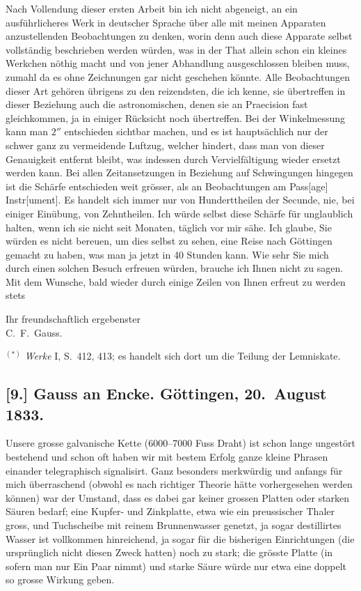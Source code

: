 \documentclass[12pt,a4paper]{article}
\begin{document}
Nach Vollendung dieser ersten Arbeit bin ich nicht abgeneigt, an ein ausf\"uhrlicheres Werk in deutscher Sprache \"uber alle mit meinen Apparaten anzustellenden Beobachtungen zu denken, worin denn auch diese Apparate selbst vollst\"andig beschrieben werden w\"urden, was in der That allein schon ein kleines Werkchen n\"othig macht und von jener Abhandlung ausgeschlossen bleiben muss, zumahl da es ohne Zeichnungen gar nicht geschehen k\"onnte. Alle Beobachtungen dieser Art geh\"oren \"ubrigens zu den reizendsten, die ich kenne, sie \"ubertreffen in dieser Beziehung auch die astronomischen, denen sie an Praecision fast gleichkommen, ja in einiger R\"ucksicht noch \"ubertreffen. Bei der Winkelmessung kann man $2''$ entschieden sichtbar machen, und es ist haupts\"achlich nur der schwer ganz zu vermeidende Luftzug, welcher hindert, dass man von dieser Genauigkeit entfernt bleibt, was indessen durch Vervielf\"altigung wieder ersetzt werden kann. Bei allen Zeitansetzungen in Beziehung auf Schwingungen hingegen ist die Sch\"arfe entschieden weit gr\"osser, als an Beobachtungen am Pass[age] Instr[ument]. Es handelt sich immer nur von Hunderttheilen der Secunde, nie, bei einiger Ein\"ubung, von Zehntheilen. Ich w\"urde selbst diese Sch\"arfe f\"ur unglaublich halten, wenn ich sie nicht seit Monaten, t\"aglich vor mir s\"ahe. Ich glaube, Sie w\"urden es nicht bereuen, um dies selbst zu sehen, eine Reise nach G\"ottingen gemacht zu haben, was man ja jetzt in 40 Stunden kann. Wie sehr Sie mich durch einen solchen Besuch erfreuen w\"urden, brauche ich Ihnen nicht zu sagen. Mit dem Wunsche, bald wieder durch einige Zeilen von Ihnen erfreut zu werden stets

\begin{flushright}
Ihr freundschaftlich ergebenster \\
C.~F.~Gauss.
\end{flushright}

\medskip\noindent
$^{(*)}$ \textit{Werke} I, S.~412, 413; es handelt sich dort um die Teilung der Lemniskate.


\subsection*{[9.] Gauss an Encke. G\"ottingen, 20.~August 1833.}

Unsere grosse galvanische Kette (6000--7000 Fuss Draht) ist schon lange ungest\"ort bestehend und schon oft haben wir mit bestem Erfolg ganze kleine Phrasen einander telegraphisch signalisirt. Ganz besonders merkw\"urdig und anfangs f\"ur mich \"uberraschend (obwohl es nach richtiger Theorie h\"atte vorhergesehen werden k\"onnen) war der Umstand, dass es dabei gar keiner grossen Platten oder starken S\"auren bedarf; eine Kupfer- und Zinkplatte, etwa wie ein preussischer Thaler gross, und Tuchscheibe mit reinem Brunnenwasser genetzt, ja sogar destillirtes Wasser ist vollkommen hinreichend, ja sogar f\"ur die bisherigen Einrichtungen (die urspr\"unglich nicht diesen Zweck hatten) noch zu stark; die gr\"osste Platte (in sofern man nur Ein Paar nimmt) und starke S\"aure w\"urde nur etwa eine doppelt so grosse Wirkung geben.\dotfill
\end{document}
